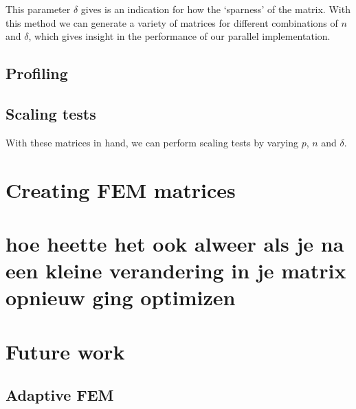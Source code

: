 \documentclass[11pt]{amsart}
\theoremstyle{definition}
\begin{document}
This parameter $\delta$ gives is an indication for how the `sparness' of the matrix. With this method we can generate a variety of matrices
for different combinations of $n$ and $\delta$, which gives insight in the performance of our parallel implementation.
\subsection{Profiling}
\subsection{Scaling tests}
With these matrices in hand, we can perform scaling tests by varying $p$, $n$ and $\delta$.

\section{Creating FEM matrices}
\section{hoe heette het ook alweer als je na een kleine verandering in je matrix opnieuw ging optimizen}

\section{Future work}
\subsection{Adaptive FEM}




\end{document}
